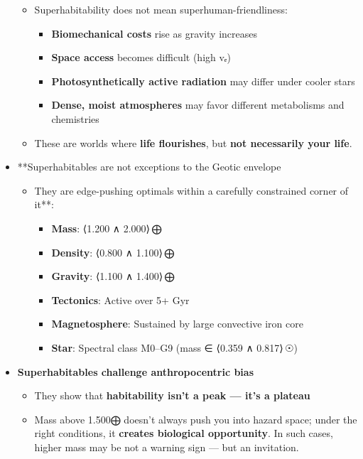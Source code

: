 \documentclass[
  letterpaper,
]{book}
\providecommand{\tightlist}{%
  \setlength{\itemsep}{0pt}\setlength{\parskip}{0pt}}
\begin{document}
\begin{itemize}
  \begin{itemize}
  \tightlist
  \item
    Superhabitability does not mean superhuman-friendliness:

    \begin{itemize}
    \tightlist
    \item
      \textbf{Biomechanical costs} rise as gravity increases\\
    \item
      \textbf{Space access} becomes difficult (high vₑ\hspace{0pt})\\
    \item
      \textbf{Photosynthetically active radiation} may differ under
      cooler stars\\
    \item
      \textbf{Dense, moist atmospheres} may favor different metabolisms
      and chemistries
    \end{itemize}
  \item
    These are worlds where \textbf{life flourishes}, but \textbf{not
    necessarily your life}.
  \end{itemize}
\item
  **Superhabitables are not exceptions to the Geotic envelope

  \begin{itemize}
  \tightlist
  \item
    They are edge-pushing optimals within a carefully constrained corner
    of it**:

    \begin{itemize}
    \tightlist
    \item
      \textbf{Mass}: ⟨1.200 ∧ 2.000⟩\,⨁
    \item
      \textbf{Density}: ⟨0.800 ∧ 1.100⟩\,⨁
    \item
      \textbf{Gravity}: ⟨1.100 ∧ 1.400⟩\,⨁
    \item
      \textbf{Tectonics}: Active over 5+ Gyr
    \item
      \textbf{Magnetosphere}: Sustained by large convective iron core
    \item
      \textbf{Star}: Spectral class M0--G9 (mass ∈ ⟨0.359 ∧ 0.817⟩\,☉)
    \end{itemize}
  \end{itemize}
\item
  \textbf{Superhabitables challenge anthropocentric bias}

  \begin{itemize}
  \tightlist
  \item
    They show that \textbf{habitability isn't a peak --- it's a plateau}
  \item
    Mass above 1.500⨁ doesn't always push you into hazard space; under
    the right conditions, it \textbf{creates biological opportunity}. In
    such cases, higher mass may be not a warning sign --- but an
    invitation.
  \end{itemize}
\end{itemize}
\end{document}
